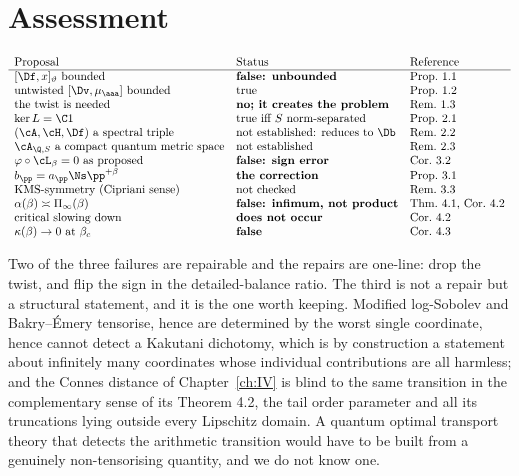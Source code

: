 \section{Assessment}

\[
\begin{array}{lll}
\text{Proposal} & \text{Status} & \text{Reference}\\\hline
[\Df,x]_\vartheta\ \text{bounded} & \textbf{false: unbounded} & \text{Prop.~1.1}\\
\text{untwisted}\ [\Dv,\mu_\aaa]\ \text{bounded} & \text{true} & \text{Prop.~1.2}\\
\text{the twist is needed} & \textbf{no; it creates the problem} & \text{Rem.~1.3}\\
\ker L=\C1 & \text{true iff }S\ \text{norm-separated} & \text{Prop.~2.1}\\
(\cA,\cH,\Df)\ \text{a spectral triple} & \text{not established: reduces to }\Db & \text{Rem.~2.2}\\
\cA_{\Q,S}\ \text{a compact quantum metric space} & \text{not established} & \text{Rem.~2.3}\\
\varphi\circ\cL_\beta=0\ \text{as proposed} & \textbf{false: sign error} & \text{Cor.~3.2}\\
b_\pp=a_\pp\Ns\pp^{+\beta} & \textbf{the correction} & \text{Prop.~3.1}\\
\text{KMS-symmetry (Cipriani sense)} & \text{not checked} & \text{Rem.~3.3}\\
\alpha(\beta)\asymp\Pi_\infty(\beta) & \textbf{false: infimum, not product} & \text{Thm.~4.1, Cor.~4.2}\\
\text{critical slowing down} & \textbf{does not occur} & \text{Cor.~4.2}\\
\kappa(\beta)\to0\ \text{at}\ \beta_c & \textbf{false} & \text{Cor.~4.3}
\end{array}
\]

Two of the three failures are repairable and the repairs are one-line: drop the twist, and
flip the sign in the detailed-balance ratio. The third is not a repair but a structural
statement, and it is the one worth keeping. Modified log-Sobolev and Bakry--\'Emery
tensorise, hence are determined by the worst single coordinate, hence cannot detect a
Kakutani dichotomy, which is by construction a statement about infinitely many coordinates
whose individual contributions are all harmless; and the Connes distance of Chapter~\ref{ch:IV} is
blind to the same transition in the complementary sense of its Theorem 4.2, the tail order
parameter and all its truncations lying outside every Lipschitz domain. A quantum optimal
transport theory that detects the arithmetic transition would have to be built from a
genuinely non-tensorising quantity, and we do not know one.

